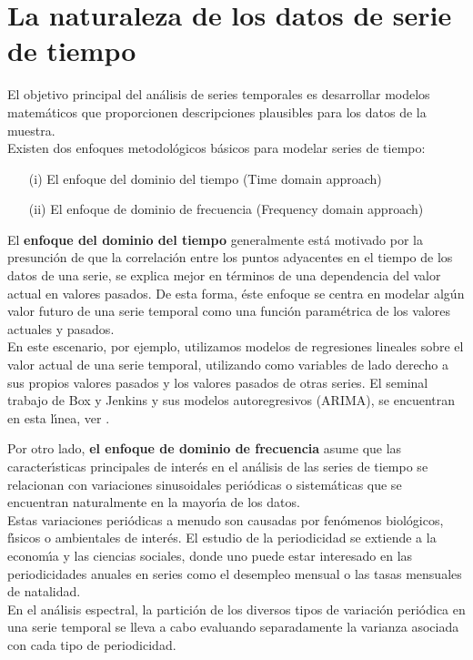 
\section{La naturaleza de los datos de serie de tiempo}

El objetivo principal del an\'alisis de series temporales es desarrollar modelos matem\'aticos que proporcionen descripciones plausibles para los datos de la muestra.
\\
Existen dos enfoques metodol\'ogicos b\'asicos para modelar series de tiempo:

	\begin{itemize}
		\item[(i)] El enfoque del dominio del tiempo (Time domain approach)
		\item[(ii)] El enfoque de dominio de frecuencia (Frequency domain approach)
	\end{itemize}

\begin{frame}

El \textbf{enfoque del dominio del tiempo} generalmente est\'a motivado por la presunci\'on de que la correlaci\'on entre los puntos adyacentes en el tiempo de los datos de una serie, se explica mejor en t\'erminos de una dependencia del valor actual en valores pasados. De esta forma, \'este enfoque se centra en modelar alg\'un valor futuro de una serie temporal como una función param\'etrica de los valores actuales y pasados.
\\
En este escenario, por ejemplo, utilizamos modelos de regresiones lineales sobre el valor actual de una serie temporal, utilizando como variables de lado derecho a sus propios valores pasados y los valores pasados de otras series. El seminal trabajo de Box y Jenkins y sus modelos autoregresivos (ARIMA), se encuentran en esta l\'\i{}nea, ver \cite{BoxJenkins}.

\end{frame}

\begin{frame}

Por otro lado, \textbf{el enfoque de dominio de frecuencia} asume que las caracter\'\i{}sticas principales de inter\'es en el an\'alisis de las series de tiempo se relacionan con variaciones sinusoidales peri\'odicas o sistem\'aticas que se encuentran naturalmente en la mayor\'\i{}a de los datos.
\\
Estas variaciones peri\'odicas a menudo son causadas por fen\'omenos biol\'ogicos, f\'\i{}sicos o ambientales de inter\'es. El estudio de la periodicidad se extiende a la econom\'\i{}a y las ciencias sociales, donde uno puede estar interesado en las periodicidades anuales en series como el desempleo mensual o las tasas mensuales de natalidad.
\\
En el an\'alisis espectral, la partici\'on de los diversos tipos de variaci\'on peri\'odica en una serie temporal se lleva a cabo evaluando separadamente la varianza asociada con cada tipo de periodicidad.

\end{frame}
\pagebreak
